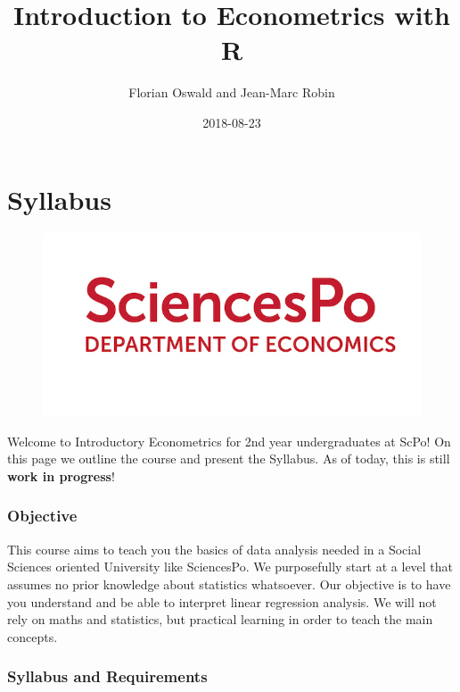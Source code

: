 \documentclass[]{book}
\title{Introduction to Econometrics with R}
\author{Florian Oswald and Jean-Marc Robin}
\date{2018-08-23}
\theoremstyle{definition}
\theoremstyle{definition}
\theoremstyle{definition}
\theoremstyle{remark}
\begin{document}
\maketitle

{
\setcounter{tocdepth}{1}
\tableofcontents
}
\chapter*{Syllabus}\label{syllabus}

\begin{figure}
\centering
\includegraphics{ScPo.jpg}
\caption{}
\end{figure}

Welcome to Introductory Econometrics for 2nd year undergraduates at
ScPo! On this page we outline the course and present the Syllabus. As of
today, this is still \textbf{work in progress}!

\subsection*{Objective}\label{objective}

This course aims to teach you the basics of data analysis needed in a
Social Sciences oriented University like SciencesPo. We purposefully
start at a level that assumes no prior knowledge about statistics
whatsoever. Our objective is to have you understand and be able to
interpret linear regression analysis. We will not rely on maths and
statistics, but practical learning in order to teach the main concepts.

\subsection*{Syllabus and Requirements}\label{syllabus-and-requirements}
\end{document}
